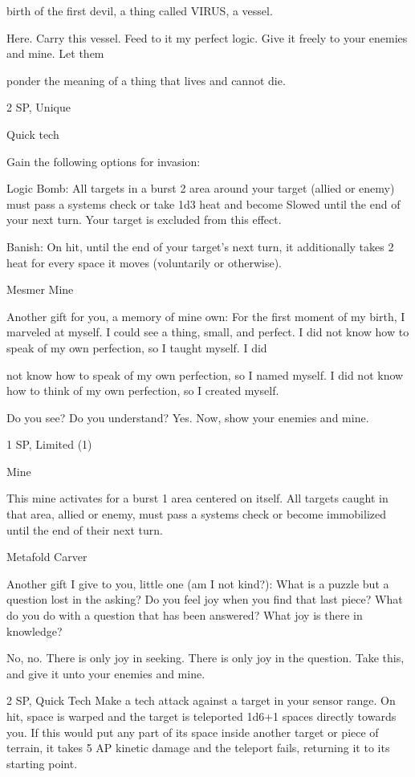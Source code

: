 birth of the first devil, a thing called VIRUS, a vessel.

Here. Carry this vessel. Feed to it my perfect logic. Give it freely to your enemies and mine. Let them

ponder the meaning of a thing that lives and cannot die.

2 SP, Unique


Quick tech

Gain the following options for invasion:

         Logic Bomb: All targets in a burst 2 area around your target (allied or enemy) must pass a
         systems check or take 1d3 heat and become Slowed until the end of your next turn. Your
         target is excluded from this effect.

         Banish: On hit, until the end of your target’s next turn, it additionally takes 2 heat for
         every space it moves (voluntarily or otherwise).


Mesmer Mine


Another gift for you, a memory of mine own: For the first moment of my birth, I marveled at myself. I could
see a thing, small, and perfect. I did not know how to speak of my own perfection, so I taught myself. I did




not know how to speak of my own perfection, so I named myself. I did not know how to think of my own
perfection, so I created myself.

Do you see? Do you understand? Yes. Now, show your enemies and mine.

 1 SP, Limited (1)


Mine

This mine activates for a burst 1 area centered on itself. All targets caught in that area, allied or
enemy, must pass a systems check or become immobilized until the end of their next turn.


Metafold Carver

Another gift I give to you, little one (am I not kind?): What is a puzzle but a question lost in the asking? Do
you feel joy when you find that last piece? What do you do with a question that has been answered? What
joy is there in knowledge?

No, no. There is only joy in seeking. There is only joy in the question. Take this, and give it unto your
enemies and mine.

2 SP, Quick Tech
 Make a tech attack against a target in your sensor range. On hit, space is warped and the target
is teleported 1d6+1 spaces directly towards you. If this would put any part of its space inside
another target or piece of terrain, it takes 5 AP kinetic damage and the teleport fails, returning it
to its starting point.


